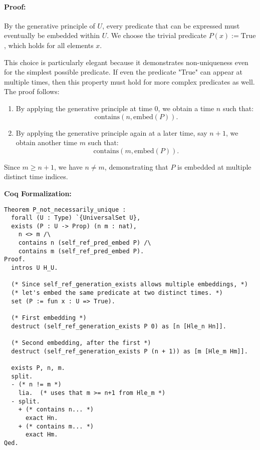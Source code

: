 \documentclass[12pt]{article}
\begin{document}
\paragraph{Proof:}
By the generative principle of \( U \), every predicate that can be expressed must eventually be embedded within \( U \). We choose the trivial predicate \( P(x) := \text{True} \), which holds for all elements \( x \). 

This choice is particularly elegant because it demonstrates non-uniqueness even for the simplest possible predicate. If even the predicate "True" can appear at multiple times, then this property must hold for more complex predicates as well. The proof follows:

\begin{enumerate}
    \item By applying the generative principle at time \( 0 \), we obtain a time \( n \) such that:
    \begin{equation}
        \text{contains}(n, \text{embed}(P)).
    \end{equation}
    \item By applying the generative principle again at a later time, say \( n + 1 \), we obtain another time \( m \) such that:
    \begin{equation}
        \text{contains}(m, \text{embed}(P)).
    \end{equation}
\end{enumerate}

Since \( m \geq n + 1 \), we have \( n \neq m \), demonstrating that \( P \) is embedded at multiple distinct time indices.

\textbf{Coq Formalization:}
\begin{lstlisting}[language=Coq]
Theorem P_not_necessarily_unique :
  forall (U : Type) `{UniversalSet U},
  exists (P : U -> Prop) (n m : nat),
    n <> m /\
    contains n (self_ref_pred_embed P) /\
    contains m (self_ref_pred_embed P).
Proof.
  intros U H_U.

  (* Since self_ref_generation_exists allows multiple embeddings, *)
  (* let's embed the same predicate at two distinct times. *)
  set (P := fun x : U => True).

  (* First embedding *)
  destruct (self_ref_generation_exists P 0) as [n [Hle_n Hn]].

  (* Second embedding, after the first *)
  destruct (self_ref_generation_exists P (n + 1)) as [m [Hle_m Hm]].

  exists P, n, m.
  split.
  - (* n != m *)
    lia.  (* uses that m >= n+1 from Hle_m *)
  - split.
    + (* contains n... *)
      exact Hn.
    + (* contains m... *)
      exact Hm.
Qed.
\end{lstlisting}
\end{document}
